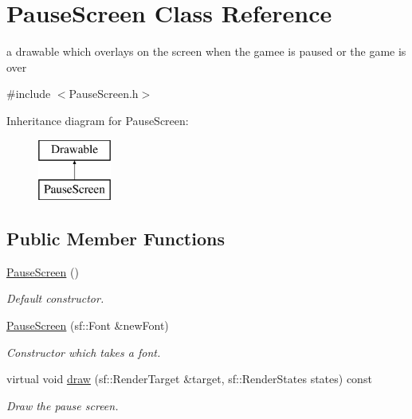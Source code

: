 \hypertarget{class_pause_screen}{\section{Pause\+Screen Class Reference}
\label{class_pause_screen}
}


a drawable which overlays on the screen when the gamee is paused or the game is over  




{\ttfamily \#include $<$Pause\+Screen.\+h$>$}

Inheritance diagram for Pause\+Screen\+:\begin{figure}[H]
\begin{center}
\leavevmode
\includegraphics[height=2.000000cm]{class_pause_screen}
\end{center}
\end{figure}
\subsection*{Public Member Functions}
\begin{DoxyCompactItemize}
\item 
\hypertarget{class_pause_screen_a42a6d2150dbd1c523c374b04cb93c524}{\hyperlink{class_pause_screen_a42a6d2150dbd1c523c374b04cb93c524}{Pause\+Screen} ()}\label{class_pause_screen_a42a6d2150dbd1c523c374b04cb93c524}

\begin{DoxyCompactList}\small\item\em Default constructor. \end{DoxyCompactList}\item 
\hyperlink{class_pause_screen_a008433b17bf4da5799b76595395e2e0e}{Pause\+Screen} (sf\+::\+Font \&new\+Font)
\begin{DoxyCompactList}\small\item\em Constructor which takes a font. \end{DoxyCompactList}\item 
virtual void \hyperlink{class_pause_screen_a268c42dc11b1d8b6d5e141066e73d693}{draw} (sf\+::\+Render\+Target \&target, sf\+::\+Render\+States states) const 
\begin{DoxyCompactList}\small\item\em Draw the pause screen. \end{DoxyCompactList}\end{DoxyCompactItemize}


